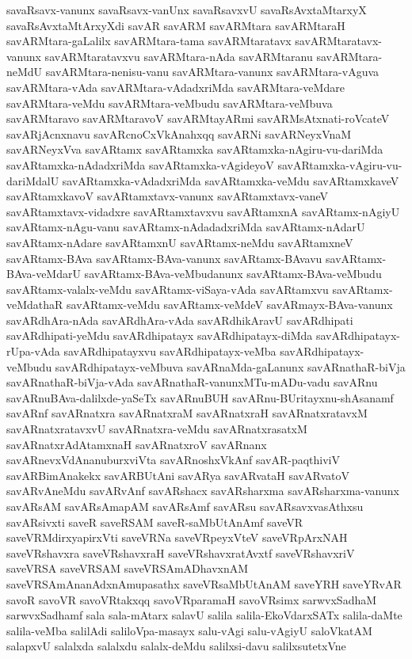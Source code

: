 {savaRsavx-vanunx
savaRsavx-vanUnx
savaRsavxvU
savaRsAvxtaMtarxyX
savaRsAvxtaMtArxyXdi
savAR
savARM
savARMtara
savARMtaraH
savARMtara-gaLalilx
savARMtara-tama
savARMtaratavx
savARMtaratavx-vanunx
savARMtaratavxvu
savARMtara-nAda
savARMtaranu
savARMtara-neMdU
savARMtara-nenisu-vanu
savARMtara-vanunx
savARMtara-vAguva
savARMtara-vAda
savARMtara-vAdadxriMda
savARMtara-veMdare
savARMtara-veMdu
savARMtara-veMbudu
savARMtara-veMbuva
savARMtaravo
savARMtaravoV
savARMtayARmi
savARMsAtxnati-roVcateV
savARjAcnxnavu
savARcnoCxVkAnahxqq
savARNi
savARNeyxVnaM
savARNeyxVva
savARtamx
savARtamxka
savARtamxka-nAgiru-vu-dariMda
savARtamxka-nAdadxriMda
savARtamxka-vAgideyoV
savARtamxka-vAgiru-vu-dariMdalU
savARtamxka-vAdadxriMda
savARtamxka-veMdu
savARtamxkaveV
savARtamxkavoV
savARtamxtavx-vanunx
savARtamxtavx-vaneV
savARtamxtavx-vidadxre
savARtamxtavxvu
savARtamxnA
savARtamx-nAgiyU
savARtamx-nAgu-vanu
savARtamx-nAdadadxriMda
savARtamx-nAdarU
savARtamx-nAdare
savARtamxnU
savARtamx-neMdu
savARtamxneV
savARtamx-BAva
savARtamx-BAva-vanunx
savARtamx-BAvavu
savARtamx-BAva-veMdarU
savARtamx-BAva-veMbudanunx
savARtamx-BAva-veMbudu
savARtamx-valalx-veMdu
savARtamx-viSaya-vAda
savARtamxvu
savARtamx-veMdathaR
savARtamx-veMdu
savARtamx-veMdeV
savARmayx-BAva-vanunx
savARdhAra-nAda
savARdhAra-vAda
savARdhikAravU
savARdhipati
savARdhipati-yeMdu
savARdhipatayx
savARdhipatayx-diMda
savARdhipatayx-rUpa-vAda
savARdhipatayxvu
savARdhipatayx-veMba
savARdhipatayx-veMbudu
savARdhipatayx-veMbuva
savARnaMda-gaLanunx
savARnathaR-biVja
savARnathaR-biVja-vAda
savARnathaR-vanunxMTu-mADu-vadu
savARnu
savARnuBAva-dalilxde-yaSeTx
savARnuBUH
savARnu-BUritayxnu-shAsanamf
savARnf
savARnatxra
savARnatxraM
savARnatxraH
savARnatxratavxM
savARnatxratavxvU
savARnatxra-veMdu
savARnatxrasatxM
savARnatxrAdAtamxnaH
savARnatxroV
savARnanx
savARnevxVdAnanuburxviVta
savARnoshxVkAnf
savAR-paqthiviV
savARBimAnakekx
savARBUtAni
savARya
savARvataH
savARvatoV
savARvAneMdu
savARvAnf
savARshacx
savARsharxma
savARsharxma-vanunx
savARsAM
savARsAmapAM
savARsAmf
savARsu
savARsavxvasAthxsu
savARsivxti
saveR
saveRSAM
saveR-saMbUtAnAmf
saveVR
saveVRMdirxyapirxVti
saveVRNa
saveVRpeyxVteV
saveVRpArxNAH
saveVRshavxra
saveVRshavxraH
saveVRshavxratAvxtf
saveVRshavxriV
saveVRSA
saveVRSAM
saveVRSAmADhavxnAM
saveVRSAmAnanAdxnAmupasathx
saveVRsaMbUtAnAM
saveYRH
saveYRvAR
savoR
savoVR
savoVRtakxqq
savoVRparamaH
savoVRsimx
sarwvxSadhaM
sarwvxSadhamf
sala
sala-mAtarx
salavU
salila
salila-EkoVdarxSATx
salila-daMte
salila-veMba
salilAdi
saliloVpa-masayx
salu-vAgi
salu-vAgiyU
saloVkatAM
salapxvU
salalxda
salalxdu
salalx-deMdu
salilxsi-davu
salilxsutetxVne
}
